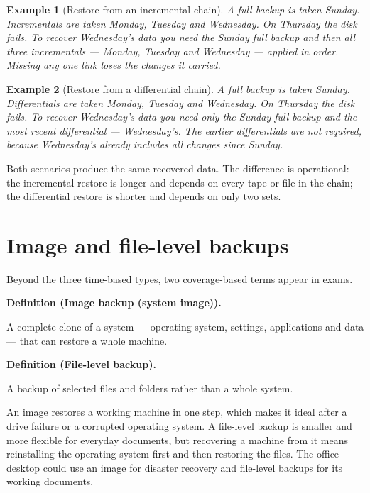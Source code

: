 \documentclass[11pt]{article}
\newtheorem{example}{Example}[section]
\newenvironment{definitionbox}[1]{%
  \par\noindent\textbf{Definition (#1).}\ \itshape
}{\par\vspace{0.3em}}
\begin{document}
\begin{example}[Restore from an incremental chain]
A full backup is taken Sunday. Incrementals are taken Monday, Tuesday and
Wednesday. On Thursday the disk fails. To recover Wednesday's data you need
the Sunday full backup and then \emph{all three} incrementals --- Monday,
Tuesday and Wednesday --- applied in order. Missing any one link loses the
changes it carried.
\end{example}

\begin{example}[Restore from a differential chain]
A full backup is taken Sunday. Differentials are taken Monday, Tuesday and
Wednesday. On Thursday the disk fails. To recover Wednesday's data you need
only the Sunday full backup and the \emph{most recent} differential ---
Wednesday's. The earlier differentials are not required, because Wednesday's
already includes all changes since Sunday.
\end{example}

Both scenarios produce the same recovered data. The difference is operational:
the incremental restore is longer and depends on every tape or file in the
chain; the differential restore is shorter and depends on only two sets.

\section{Image and file-level backups}
Beyond the three time-based types, two coverage-based terms appear in exams.

\begin{definitionbox}{Image backup (system image)}
A complete clone of a system --- operating system, settings, applications and
data --- that can restore a whole machine.
\end{definitionbox}

\begin{definitionbox}{File-level backup}
A backup of selected files and folders rather than a whole system.
\end{definitionbox}

An image restores a working machine in one step, which makes it ideal after a
drive failure or a corrupted operating system. A file-level backup is smaller
and more flexible for everyday documents, but recovering a machine from it
means reinstalling the operating system first and then restoring the files.
The office desktop could use an image for disaster recovery and file-level
backups for its working documents.
\end{document}

